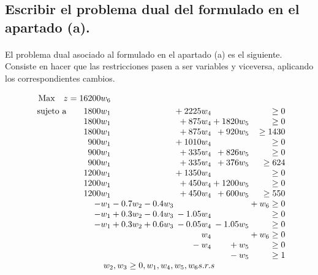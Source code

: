\documentclass[10pt, a4paper]{article}
\begin{document}
		\subsection{Escribir el problema dual del formulado en el apartado (a).}

			\paragraph{}
			El problema dual asociado al formulado en el apartado (a) es el siguiente. Consiste en hacer que las restricciones pasen a ser variables y viceversa, aplicando los correspondientes cambios.

			\[
			  \begin{array}{r@{}r@{}r@{}r@{}r@{}r@{}l}
			    \text{Max} \quad z = 16200w_{6} \\[\jot]
			    \text{sujeto a}\qquad 	1800w_{1} 	&{} 		&{} 		&{} +2225w_{4} 	&{} 			&{}			\geq 0 \\
			                     		1800w_{1} 	&{} 		&{} 		&{} +875w_{4}	&{} +1820w_{5}	&{}			\geq 0 \\
								 		1800w_{1} 	&{} 		&{} 		&{} +875w_{4}	&{} +920w_{5}	&{} 		\geq 1430 \\
								 		900w_{1}  	&{} 		&{} 		&{} +1010w_{4}	&{} 			&{}     	\geq 0  \\
								 		900w_{1}  	&{} 		&{} 		&{} +335w_{4}	&{} +826w_{5}	&{}  		\geq 0 \\
										900w_{1}    &{} 		&{} 		&{} +335w_{4} 	&{} +376w_{5}	&{}  		\geq 624 \\
										1200w_{1}   &{}  		&{} 		&{} +1350w_{4}	&{} 			&{}  		\geq 0 \\
										1200w_{1}   &{}  		&{} 		&{} +450w_{4}	&{} +1200w_{5}	&{} 		\geq 0 \\
										1200w_{1}  	&{} 		&{} 	 	&{} +450w_{4}	&{} +600w_{5}	&{} 		\geq 550 \\
										-w_{1}		&{}-0.7 w_{2}&{}-0.4w_{3}&{} 			&{} 			&{} + w_{6} \geq 0 \\
										-w_{1}		&{}+0.3 w_{2}&{}-0.4w_{3}&{}-1.05w_{4} 	&{} 			&{} 		\geq 0 \\
										-w_{1}		&{}+0.3 w_{2}&{}+0.6w_{3}&{}-0.05w_{4} 	&{} -1.05w_{5}	&{} 		\geq 0 \\
													&{} 		&{} 	 	&{}w_{4} 		&{} 			&{} + w_{6}	\geq 0 \\
													&{} 		&{}  		&{}-w_{4} 	 	&{} +w_{5}		&{}			\geq 0 \\
													&{} 		&{}  		&{} 			&{} -w_{5}		&{}			\geq 1 \\
			     \multicolumn{6}{c}{ w_{2}, w_{3} \geq 0, w_{1}, w_{4}, w_{5}, w_{6} s.r.s}


			  \end{array}
			\]
\end{document}
